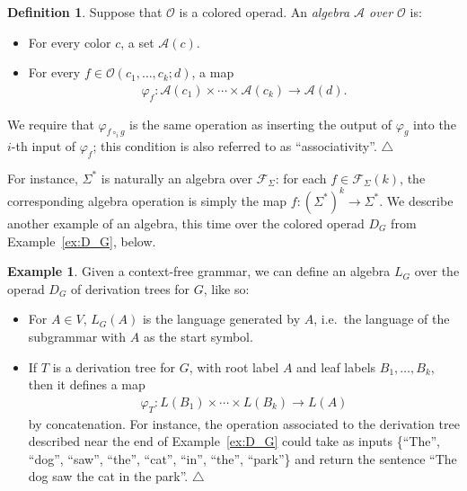 \documentclass{article}
\theoremstyle{plain}
\theoremstyle{definition}
\newtheorem{definition}[theorem]{Definition}
\theoremstyle{remark}
\theoremstyle{definition}
\newtheorem{example}[theorem]{Example}
\newcommand\cA{\mathcal{A}}
\newcommand\cF{\mathcal{F}}
\newcommand\cO{\mathcal{O}}
\begin{document}
\begin{definition}
Suppose that $\cO$ is a colored operad.
An \emph{algebra $\cA$ over $\cO$} is:
\begin{itemize}
\item For every color $c$, a set $\cA(c)$.

\item For every $f \in \cO(c_1,\ldots,c_k;d)$, a map
\begin{align}
\varphi_f\colon \cA(c_1)\times\cdots\times\cA(c_k)\to\cA(d).
\end{align}
\end{itemize}
We require that $\varphi_{f \circ_i g}$ is the same operation as inserting the output of $\varphi_g$ into the $i$-th input of $\varphi_f$; this condition is also referred to as ``associativity''.
\null\hfill$\triangle$
\end{definition}

For instance, $\Sigma^*$ is naturally an algebra over $\cF_\Sigma$: for each $f \in \cF_\Sigma(k)$, the corresponding algebra operation is simply the map $f : (\Sigma^*)^k \to \Sigma^*$.
We describe another example of an algebra, this time over the colored operad $D_G$ from Example~\ref{ex:D_G}, below.

\begin{example}
Given a context-free grammar, we can define an algebra $L_G$ over the operad $D_G$ of derivation trees for $G$, like so:
\begin{itemize}
\item For $A \in V$, $L_G(A)$ is the language generated by $A$, i.e.\ the language of the subgrammar with $A$ as the start symbol.

\item If $T$ is a derivation tree for $G$, with root label $A$ and leaf labels $B_1,\ldots,B_k$, then it defines a map
\begin{align}
\varphi_T\colon
L(B_1)\times\cdots\times L(B_k) \to L(A)
\end{align}
by concatenation.
For instance, the operation associated to the derivation tree described near the end of Example~\ref{ex:D_G} could take as inputs \{``The'', ``dog'', ``saw'', ``the'', ``cat'', ``in'', ``the'', ``park''\} and return the sentence ``The dog saw the cat in the park''.
\null\hfill$\triangle$
\end{itemize}
\end{example}
\end{document}
